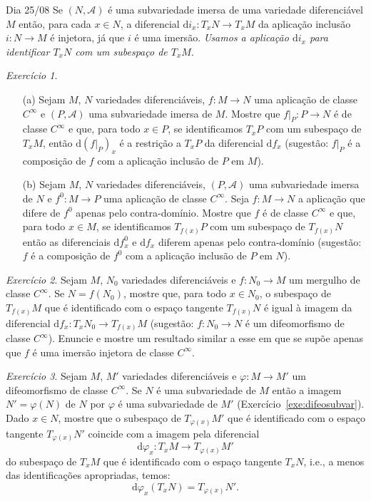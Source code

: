 \documentclass[oneside,11pt]{amsart}
\newcommand{\dd}{\mathrm d}
\theoremstyle{remark}\newtheorem{exercise}{Exercício}[section]
\theoremstyle{plain}\newtheorem{teo}{Teorema}[section]
\theoremstyle{plain}\newtheorem{lem}[teo]{Lema}
\theoremstyle{plain}\newtheorem{prop}[teo]{Proposição}
\theoremstyle{definition}\newtheorem{defin}[teo]{Definição}
\theoremstyle{remark}\newtheorem{rem}[teo]{Observação}
\theoremstyle{definition}\newtheorem{example}[teo]{Exemplo}
\numberwithin{equation}{section}
\begin{document}
\begin{section}{Dia 25/08}
Se $(N,\mathcal A)$ é uma subvariedade imersa de uma variedade diferenciável $M$ então, para cada $x\in N$, a diferencial $\dd i_x:T_xN\to T_xM$ da aplicação
inclusão $i:N\to M$ é injetora, já que $i$ é uma imersão. {\em Usamos a aplicação $\dd i_x$ para identificar $T_xN$ com um subespaço de $T_xM$}.
\begin{exercise}\label{exe:difdomcodom}\
\begin{itemize}
\item[(a)] Sejam $M$, $N$ variedades diferenciáveis, $f:M\to N$ uma aplicação de classe $C^\infty$ e $(P,\mathcal A)$ uma subvariedade imersa de $M$.
Mostre que $f\vert_P:P\to N$ é de classe $C^\infty$ e que, para todo $x\in P$, se identificamos $T_xP$ com um subespaço de $T_xM$, então
$\dd(f\vert_P)_x$ é a restrição a $T_xP$ da diferencial $\dd f_x$ (sugestão: $f\vert_P$ é a composição de $f$ com a aplicação inclusão de $P$ em $M$).
\item[(b)] Sejam $M$, $N$ variedades diferenciáveis, $(P,\mathcal A)$ uma subvariedade imersa de $N$ e $f^0:M\to P$ uma aplicação de classe $C^\infty$.
Seja $f:M\to N$ a aplicação que difere de $f^0$ apenas pelo contra-domínio. Mostre que $f$ é de classe $C^\infty$ e que, para todo $x\in M$, se identificamos
$T_{f(x)}P$ com um subespaço de $T_{f(x)}N$ então as diferenciais $\dd f^0_x$ e $\dd f_x$ diferem apenas pelo contra-domínio (sugestão: $f$ é a composição
de $f^0$ com a aplicação inclusão de $P$ em $N$).
\end{itemize}
\end{exercise}

\begin{exercise}
Sejam $M$, $N_0$ variedades diferenciáveis e $f:N_0\to M$ um mergulho de classe $C^\infty$. Se $N=f(N_0)$,
mostre que, para todo $x\in N_0$, o subespaço de $T_{f(x)}M$ que é identificado com o espaço tangente $T_{f(x)}N$
é igual à imagem da diferencial $\dd f_x:T_xN_0\to T_{f(x)}M$ (sugestão: $f:N_0\to N$ é um difeomorfismo de classe $C^\infty$).
Enuncie e mostre um resultado similar a esse em que se supõe apenas que $f$ é uma imersão injetora de classe $C^\infty$.
\end{exercise}

\begin{exercise}\label{exe:esptandifeo}
Sejam $M$, $M'$ variedades diferenciáveis e $\varphi:M\to M'$ um difeomorfismo de classe $C^\infty$. Se $N$ é
uma subvariedade de $M$ então a imagem $N'=\varphi(N)$ de $N$ por $\varphi$
é uma subvariedade de $M'$ (Exercício~\ref{exe:difeosubvar}).
Dado $x\in N$, mostre que o subespaço de $T_{\varphi(x)}M'$ que é identificado com o espaço tangente $T_{\varphi(x)}N'$
coincide com a imagem pela diferencial
\[\dd\varphi_x:T_xM\longrightarrow T_{\varphi(x)}M'\]
do subespaço de $T_xM$ que é identificado
com o espaço tangente $T_xN$, i.e., a menos das identificações apropriadas, temos:
\[\dd\varphi_x(T_xN)=T_{\varphi(x)}N'.\]
\end{exercise}


\end{section}
\end{document}
